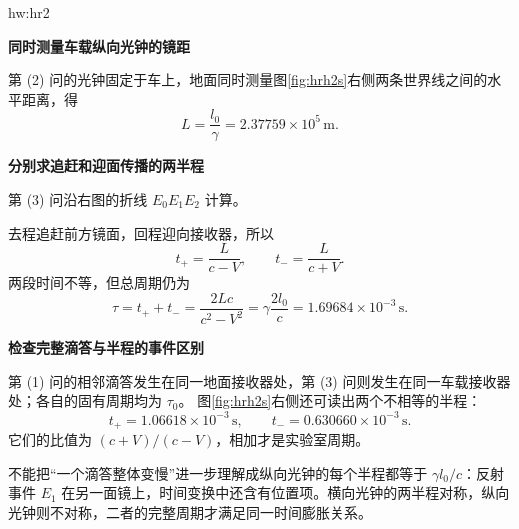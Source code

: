 \begin{drillsolution}{hw:hr2}
\par\medskip{}\noindent\textbf{同时测量车载纵向光钟的镜距}\par\nobreak
第 (2) 问的光钟固定于车上，地面同时测量图\ref{fig:hrh2s}右侧两条世界线之间的水平距离，得
\[
\boxed{L=\frac{l_0}{\gamma}=2.37759\times10^5\,\mathrm m}.
\]


\par\medskip{}\noindent\textbf{分别求追赶和迎面传播的两半程}\par\nobreak
第 (3) 问沿右图的折线 $E_0E_1E_2$ 计算。

去程追赶前方镜面，回程迎向接收器，所以
\[
t_+=\frac{L}{c-V},\qquad t_-=\frac{L}{c+V}.
\]
两段时间不等，但总周期仍为
\[
\boxed{\tau=t_++t_-=\frac{2Lc}{c^2-V^2}
 =\gamma\frac{2l_0}{c}=1.69684\times10^{-3}\,\mathrm s}.
\]


\par\medskip{}\noindent\textbf{检查完整滴答与半程的事件区别}\par\nobreak
第 (1) 问的相邻滴答发生在同一地面接收器处，第 (3) 问则发生在同一车载接收器处；各自的固有周期均为 $\tau_0$。
图\ref{fig:hrh2s}右侧还可读出两个不相等的半程：
\[
t_+=1.06618\times10^{-3}\,\mathrm s,\qquad
t_-=0.630660\times10^{-3}\,\mathrm s.
\]
它们的比值为 $(c+V)/(c-V)$，相加才是实验室周期。

不能把“一个滴答整体变慢”进一步理解成纵向光钟的每个半程都等于 $\gamma l_0/c$：反射事件 $E_1$ 在另一面镜上，时间变换中还含有位置项。横向光钟的两半程对称，纵向光钟则不对称，二者的完整周期才满足同一时间膨胀关系。

\end{drillsolution}

